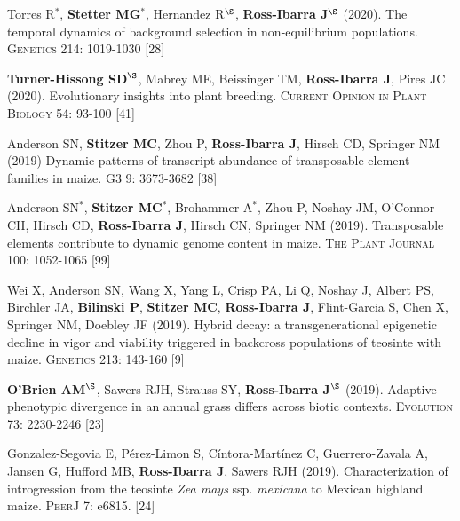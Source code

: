 \documentclass[letterpaper,10pt]{article}
\begin{document}
\begin{etaremune}
\item Torres R$^*$, \textbf{Stetter MG}$^*$, Hernandez R$^\S$, \textbf{Ross-Ibarra J}$^\S$ (2020). The temporal dynamics of background selection in non-equilibrium populations. \textsc{Genetics} 214: 1019-1030
 [28]\\

\item \textbf{Turner-Hissong SD}$^\S$, Mabrey ME, Beissinger TM, \textbf{Ross-Ibarra J}, Pires JC (2020). Evolutionary insights into plant breeding. \textsc{Current Opinion in Plant Biology} 54: 93-100
 [41]\\

\item  Anderson SN, \textbf{Stitzer MC},  Zhou P, \textbf{Ross-Ibarra J}, Hirsch CD, Springer NM (2019) Dynamic patterns of transcript abundance of transposable element families in maize. \textsc{G3} 9: 3673-3682
 [38]\\

\item  Anderson SN$^*$, \textbf{Stitzer MC}$^*$,  Brohammer A$^*$, Zhou P, Noshay JM,  O'Connor CH, Hirsch CD, \textbf{Ross-Ibarra J}, Hirsch CN, Springer NM (2019). Transposable elements contribute to dynamic genome content in maize. \textsc{The Plant Journal} 100: 1052-1065
 [99]\\

\item Wei X,  Anderson SN,  Wang X,  Yang L, Crisp PA,  Li Q,  Noshay J, Albert PS, Birchler JA,  \textbf{Bilinski P}, \textbf{Stitzer MC}, \textbf{Ross-Ibarra J},  Flint-Garcia S,  Chen X,  Springer NM, Doebley JF (2019). Hybrid decay: a transgenerational epigenetic decline in vigor and viability triggered in backcross populations of teosinte with maize. \textsc{Genetics} 213: 143-160
 [9]\\

\item \textbf{O'Brien AM}$^\S$, Sawers RJH, Strauss SY, \textbf{Ross-Ibarra J}$^\S$ (2019). Adaptive phenotypic divergence in an annual grass differs across biotic contexts. \textsc{Evolution} 73: 2230-2246
 [23]\\

\item  Gonzalez-Segovia E,  P\'erez-Limon S,  C\'intora-Mart\'inez C,  Guerrero-Zavala A,  Jansen G,  Hufford MB, \textbf{Ross-Ibarra J}, Sawers RJH (2019). Characterization of introgression from the teosinte \textit{Zea mays} ssp. \textit{mexicana} to Mexican highland maize. \textsc{PeerJ} 7: e6815. %
 [24]\\


\end{etaremune}
\end{document}
